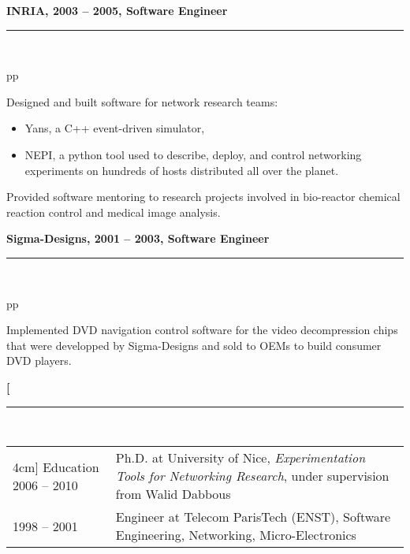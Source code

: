 \documentclass[a4paper,12pt]{article}
\newcommand{\ligne}[1]{\rule[0.5ex]{\textwidth}{#1}\\}
\newcommand{\styleRub}[1]{\textbf{\large #1}\par}
\newcommand{\indentStd}{\noindent\hspace*{10pt}}
\newenvironment{rubrique}[2][\linewidth]%
{\styleRub{#2}%
\ligne{0.5mm}
\setlength{\lenB}{#1}%
\setlength{\lenC}{\linewidth}%
\addtolength{\lenC}{-\lenA}%
\addtolength{\lenC}{-\lenB}%
\addtolength{\lenC}{-19pt}
\indentStd\begin{tabular}[t]{p{\lenB}p{\lenC}}}
{\end{tabular}}
\newlength{\lenA} %
\newlength{\lenB} %
\newlength{\lenC} %
\begin{document}
\vspace{0.5cm}
\begin{rubrique}{INRIA, 2003 -- 2005, Software Engineer}

  Designed and built software for network research teams:  
  \begin{itemize}
  \item Yans, a C++ event-driven simulator,
  \item NEPI, a python tool used to describe, deploy, and control networking
    experiments on hundreds of hosts distributed all over the planet.
  \end{itemize}

  Provided software mentoring to research projects involved in 
  bio-reactor chemical reaction control and medical image analysis.

\end{rubrique}

\vspace{0.5cm}
\begin{rubrique}{Sigma-Designs, 2001 -- 2003, Software Engineer}

  Implemented DVD navigation control software for the video
  decompression chips that were developped by Sigma-Designs and
  sold to OEMs to build consumer DVD players.

\end{rubrique}

\vspace{0.5cm}
\begin{rubrique} [4cm] {Education}
  2006 -- 2010 & Ph.D. at University of Nice,
  \emph{Experimentation Tools for Networking Research}, under supervision from Walid Dabbous\\
  1998 -- 2001 & Engineer at Telecom ParisTech (ENST), Software Engineering, Networking, Micro-Electronics \\
\end{rubrique}
\end{document}
